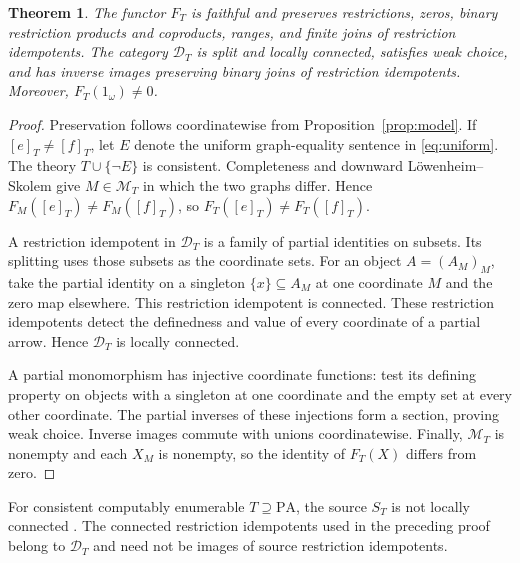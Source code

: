 \documentclass[11pt]{article}
\newtheorem{theorem}{Theorem}[section]
\newcommand{\PA}{\mathrm{PA}}
\begin{document}
\begin{theorem}\label{thm:faithful}
The functor $F_T$ is faithful and preserves restrictions, zeros, binary
restriction products and coproducts, ranges, and finite joins of
restriction idempotents. The category
$\mathcal D_T$ is split and locally connected, satisfies weak choice,
and has inverse images preserving binary joins of restriction
idempotents. Moreover,
$F_T(1_\omega)\ne0$.
\end{theorem}
\begin{proof}
Preservation follows coordinatewise from Proposition~\ref{prop:model}.
If $[e]_T\ne[f]_T$, let $E$ denote the uniform graph-equality sentence
in \eqref{eq:uniform}. The theory $T\cup\{\neg E\}$ is consistent.
Completeness and downward L\"owenheim--Skolem give
$M\in\mathcal M_T$ in which the two graphs differ. Hence
$F_M([e]_T)\ne F_M([f]_T)$, so $F_T([e]_T)\ne F_T([f]_T)$.

A restriction idempotent in $\mathcal D_T$ is a family of partial
identities on subsets. Its splitting uses those subsets as the
coordinate sets. For an object $A=(A_M)_M$, take the partial identity
on a singleton $\{x\}\subseteq A_M$ at one coordinate $M$ and the zero
map elsewhere. This restriction idempotent is connected. These
restriction idempotents detect the definedness and value of every coordinate of a partial arrow. Hence
$\mathcal D_T$ is locally connected.

A partial monomorphism has injective coordinate functions: test its
defining property on objects with a singleton at one coordinate
and the empty set at every other coordinate.
The partial inverses of these injections form a section, proving weak
choice. Inverse images commute with unions coordinatewise. Finally,
$\mathcal M_T$ is nonempty and each $X_M$ is nonempty, so the
identity of $F_T(X)$ differs from zero.
\end{proof}

For consistent computably enumerable $T\supseteq\PA$, the source $S_T$
is not locally connected \cite[Corollary 4.4, pp.~657--658]{DPM}.
The connected restriction idempotents used in the preceding proof
belong to $\mathcal D_T$ and need not be images of source restriction
idempotents.
\end{document}
